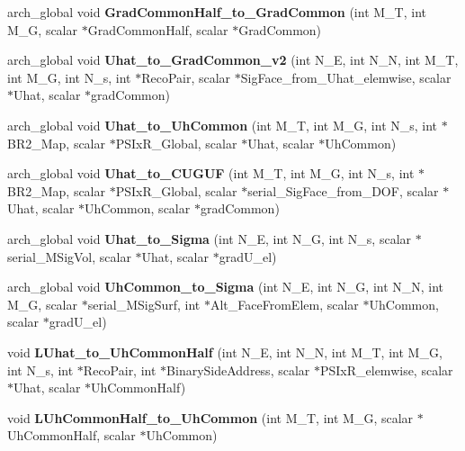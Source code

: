 \begin{DoxyCompactItemize}
\item 
arch\-\_\-global void {\bfseries Grad\-Common\-Half\-\_\-to\-\_\-\-Grad\-Common} (int M\-\_\-\-T, int M\-\_\-\-G, scalar $\ast$Grad\-Common\-Half, scalar $\ast$Grad\-Common)\label{kernels__phil_8cu_a0debc6e18c2389b970d51094880e5727}

\item 
arch\-\_\-global void {\bf Uhat\-\_\-to\-\_\-\-Grad\-Common\-\_\-v2} (int N\-\_\-\-E, int N\-\_\-\-N, int M\-\_\-\-T, int M\-\_\-\-G, int N\-\_\-s, int $\ast$Reco\-Pair, scalar $\ast$Sig\-Face\-\_\-from\-\_\-\-Uhat\-\_\-elemwise, scalar $\ast$Uhat, scalar $\ast$grad\-Common)
\item 
arch\-\_\-global void {\bf Uhat\-\_\-to\-\_\-\-Uh\-Common} (int M\-\_\-\-T, int M\-\_\-\-G, int N\-\_\-s, int $\ast$B\-R2\-\_\-\-Map, scalar $\ast$P\-S\-Ix\-R\-\_\-\-Global, scalar $\ast$Uhat, scalar $\ast$Uh\-Common)
\item 
arch\-\_\-global void {\bf Uhat\-\_\-to\-\_\-\-C\-U\-G\-U\-F} (int M\-\_\-\-T, int M\-\_\-\-G, int N\-\_\-s, int $\ast$B\-R2\-\_\-\-Map, scalar $\ast$P\-S\-Ix\-R\-\_\-\-Global, scalar $\ast$serial\-\_\-\-Sig\-Face\-\_\-from\-\_\-\-D\-O\-F, scalar $\ast$Uhat, scalar $\ast$Uh\-Common, scalar $\ast$grad\-Common)
\item 
arch\-\_\-global void {\bf Uhat\-\_\-to\-\_\-\-Sigma} (int N\-\_\-\-E, int N\-\_\-\-G, int N\-\_\-s, scalar $\ast$serial\-\_\-\-M\-Sig\-Vol, scalar $\ast$Uhat, scalar $\ast$grad\-U\-\_\-el)
\item 
arch\-\_\-global void {\bf Uh\-Common\-\_\-to\-\_\-\-Sigma} (int N\-\_\-\-E, int N\-\_\-\-G, int N\-\_\-\-N, int M\-\_\-\-G, scalar $\ast$serial\-\_\-\-M\-Sig\-Surf, int $\ast$Alt\-\_\-\-Face\-From\-Elem, scalar $\ast$Uh\-Common, scalar $\ast$grad\-U\-\_\-el)
\item 
void {\bfseries L\-Uhat\-\_\-to\-\_\-\-Uh\-Common\-Half} (int N\-\_\-\-E, int N\-\_\-\-N, int M\-\_\-\-T, int M\-\_\-\-G, int N\-\_\-s, int $\ast$Reco\-Pair, int $\ast$Binary\-Side\-Address, scalar $\ast$P\-S\-Ix\-R\-\_\-elemwise, scalar $\ast$Uhat, scalar $\ast$Uh\-Common\-Half)\label{kernels__phil_8cu_a07bc4a4a7ba4646d79801770d1d134dd}

\item 
void {\bfseries L\-Uh\-Common\-Half\-\_\-to\-\_\-\-Uh\-Common} (int M\-\_\-\-T, int M\-\_\-\-G, scalar $\ast$Uh\-Common\-Half, scalar $\ast$Uh\-Common)\label{kernels__phil_8cu_aa1a8c1f13da2938d74bd048b669b4185}


\end{DoxyCompactItemize}
